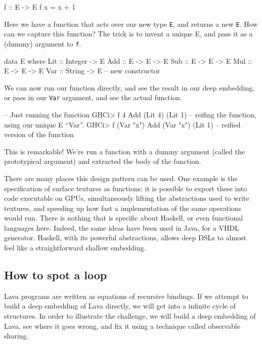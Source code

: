 \documentclass[11pt]{article}
\begin{document}
\begin{Code}

f :: E -> E
f x = x + 1
        
\end{Code}

Here we have a function that acts over our new type
\verb|E|, and returns a new \verb|E|. How can we capture
this function?
The trick is to invent a unique E, and pass it as a (dummy) argument
to \verb|f|.

\begin{Code}
data E where
  Lit :: Integer -> E
  Add :: E -> E -> E
  Sub :: E -> E -> E
  Mul :: E -> E -> E
  Var :: String -> E    -- new constructor
\end{Code}        

We can now run our function directly, and see the result in our deep embedding, or
pass in our \verb|Var| argument, and see the actual function.

\begin{Code}
-- Just running the function
GHCi> f 4
Add (Lit 4) (Lit 1)
-- reifing the function, using our unique E ``Var''.
GHCi> f (Var "x")
Add (Var "x") (Lit 1)   -- reified version of the function
\end{Code}

This is remarkable! We're run a function with 
a dummy argument (called the prototypical argument)
and extracted the body of the function.

There are many places this design pattern can be used. One example is the specification
of surface textures as functions; it is possible to export these into code executable
on GPUs, simultaneously lifting the abstractions used to write textures, and speeding
up how fast a implementation of the same operations would run.  There is nothing
that is specific about Haskell, or even functional languages here. Indeed, the same
ideas have been used in Java, for a VHDL generator\cite{Bellows:98:JHDL}. 
Haskell, with its powerful abstractions,
allows deep DSLs to almost feel like a straightforward shallow embedding.

\subsection{How to spot a loop}

Lava programs are written as equations of recursive bindings.
If we attempt to build a deep embedding of Lava directly,
we will get into a infinite cycle of structures. In order to illustrate
the challenge, we will build a deep embedding of Lava,
see where it goes wrong, and fix it using a technique called
observable sharing.
\end{document}
